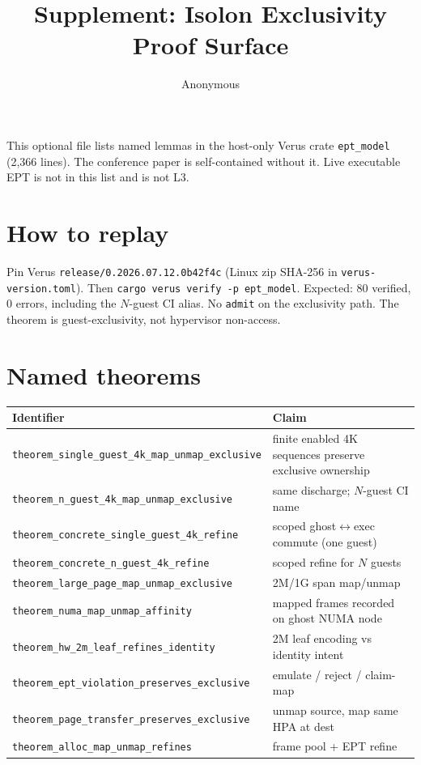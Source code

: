 \documentclass[sigplan,10pt,anonymous]{acmart}
\begin{document}
\title{Supplement: Isolon Exclusivity Proof Surface}
\author{Anonymous}
\maketitle

This optional file lists named lemmas in the host-only Verus crate
\texttt{ept\_model} (2{,}366 lines). The conference paper is self-contained
without it. Live executable EPT is not in this list and is not L3.

\section{How to replay}

Pin Verus \texttt{release/0.2026.07.12.0b42f4c} (Linux zip SHA-256
in \texttt{verus-version.toml}). Then
\texttt{cargo verus verify -p ept\_model}. Expected:
80 verified, 0 errors, including the $N$-guest CI alias. No \texttt{admit}
on the exclusivity path. The theorem is guest-exclusivity, not hypervisor
non-access.

\section{Named theorems}

\begin{tabular}{lp{6.8cm}}
\toprule
Identifier & Claim \\
\midrule
\texttt{theorem\_single\_guest\_4k\_map\_unmap\_exclusive} &
  finite enabled 4K sequences preserve exclusive ownership \\
\texttt{theorem\_n\_guest\_4k\_map\_unmap\_exclusive} &
  same discharge; $N$-guest CI name \\
\texttt{theorem\_concrete\_single\_guest\_4k\_refine} &
  scoped ghost$\leftrightarrow$exec commute (one guest) \\
\texttt{theorem\_concrete\_n\_guest\_4k\_refine} &
  scoped refine for $N$ guests \\
\texttt{theorem\_large\_page\_map\_unmap\_exclusive} &
  2M/1G span map/unmap \\
\texttt{theorem\_numa\_map\_unmap\_affinity} &
  mapped frames recorded on ghost NUMA node \\
\texttt{theorem\_hw\_2m\_leaf\_refines\_identity} &
  2M leaf encoding vs identity intent \\
\texttt{theorem\_ept\_violation\_preserves\_exclusive} &
  emulate / reject / claim-map \\
\texttt{theorem\_page\_transfer\_preserves\_exclusive} &
  unmap source, map same HPA at dest \\
\texttt{theorem\_alloc\_map\_unmap\_refines} &
  frame pool + EPT refine \\
\bottomrule
\end{tabular}
\end{document}
